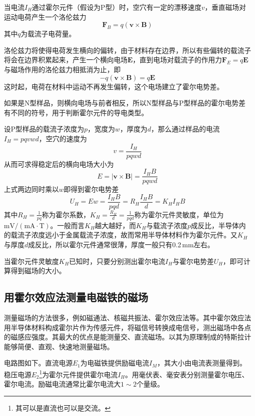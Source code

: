 \documentclass[UTF-8,twoside,cs4size]{ctexart}
\begin{document}
	当电流$ I_H $通过霍尔元件（假设为P型）时，空穴有一定的漂移速度$ v $，垂直磁场对运动电荷产生一个洛伦兹力
	\[\bm F_B=q(\bm v\times\bm B)\]
	其中$ q $为载流子电荷量。
	
	洛伦兹力将使得电荷发生横向的偏转，由于材料存在边界，所以有些偏转的载流子将会在边界积累起来，产生一个横向电场$ \bm E $，直到电场对载流子的作用力$ \bm F_E=q\bm E $与磁场作用的洛伦兹力相抵消为止，即
	\[-q(\bm v\times\bm B)=q\bm E\]
	这时起，电荷在材料中运动不再发生偏转，这个电场建立了霍尔电势差。
	
	如果是N型样品，则横向电场与前者相反，所以N型样品与P型样品的霍尔电势差有不同的符号，用于判断霍尔元件的导电类型。
	
	设P型样品的载流子浓度为$ p $，宽度为$ w $，厚度为$ d $，那么通过样品的电流$ I_H=pqvwd $，空穴的速度为
	\[v=\frac{I_H}{pqwd}\]
	从而可求得稳定后的横向电场大小为
	\[E=|\bm v\times\bm B|=\frac{I_HB}{pqwd}\]
	上式两边同时乘以$ w $即得到霍尔电势差
	\[U_H=Ew=\frac{I_HB}{pqd}=R_H\frac{I_HB}{d}=K_HI_HB\]
	其中$ R_H=\frac{1}{pq} $称为霍尔系数，$ K_H=\frac{R_H}{d}=\frac{1}{pqd} $称为霍尔元件灵敏度，单位为$ \mathrm{mV/(mA\cdot T)} $。一般而言$ K_H $越大越好，而$ K_H $与载流子浓度$ p $成反比，半导体内的载流子浓度远小于金属载流子浓度，故而常用半导体材料作为霍尔元件。又$ K_H $与厚度$ d $成反比，所以霍尔元件通常很薄，厚度一般只有0.2\,mm左右。
	
	当霍尔元件灵敏度$ K_H $已知时，只要分别测出霍尔电流$ I_H $与霍尔电势差$ U_H $，即可计算得到磁场的大小。
	
	\subsection{用霍尔效应法测量电磁铁的磁场}
	测量磁场的方法很多，例如磁通法、核磁共振法、霍尔效应法等。其中霍尔效应法用半导体材料构成霍尔片作为传感元件，将磁信号转换成电信号，测出磁场中各点的磁感应强度。其最大的优点是能测量交、直流磁场。以其为原理制成的特斯拉计能够简便、直观、快速地测量磁场。
	
	电路图如下。直流电源$ E_1 $为电磁铁提供励磁电流$ I_M $，其大小由电流表测量得到。稳压电源$ E_2 $\footnote{其可以是直流也可以是交流。}为霍尔元件提供霍尔电流$ I_H $。用毫伏表、毫安表分别测量霍尔电压、霍尔电流。励磁电流通常比霍尔电流大$ 1\sim 2 $个量级。
	
\end{document}
